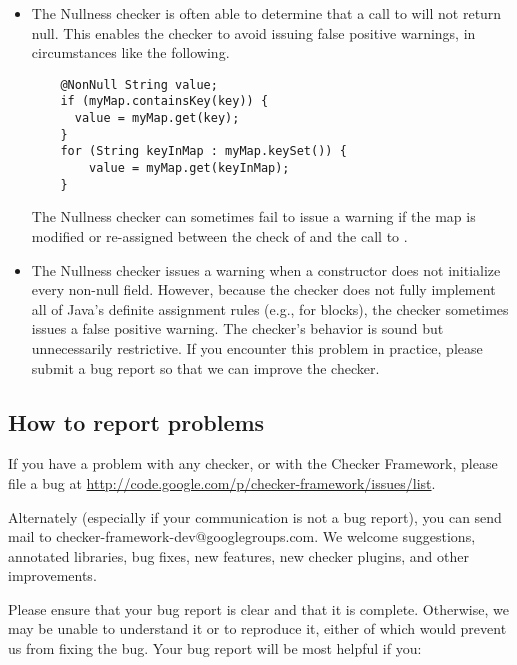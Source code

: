 \begin{itemize}
\item
  The Nullness checker is often able to determine that a call to
   will not return null.  This enables the checker to avoid
  issuing false positive warnings, in circumstances like the following.

\begin{Verbatim}
    @NonNull String value;
    if (myMap.containsKey(key)) {
      value = myMap.get(key);
    }
    for (String keyInMap : myMap.keySet()) {
        value = myMap.get(keyInMap);
    }
\end{Verbatim}

  The Nullness checker can sometimes fail to issue a warning if the map is
  modified or re-assigned between the check of  and the
  call to .



\item 
  The Nullness checker issues a warning when a constructor does not
  initialize every non-null field.  However, because the checker does not
  fully implement all of Java's definite assignment rules (e.g., for
   blocks), the checker sometimes issues a false positive
  warning.  The checker's behavior is sound but unnecessarily restrictive.
  If you encounter this problem in practice, please submit a bug report so
  that we can improve the checker.

\end{itemize}



\subsection{How to report problems\label{reporting-bugs}}

If you have a problem with any checker, or with the Checker Framework,
please file a bug at 
\url{http://code.google.com/p/checker-framework/issues/list}.

Alternately (especially if your communication is not a bug report), you can
send mail to checker-framework-dev@googlegroups.com.
We welcome suggestions, annotated libraries, bug fixes, new
features, new checker plugins, and other improvements.

Please ensure that your bug report is clear and that it is complete.
Otherwise, we may be unable to understand it or to reproduce it, either of
which would prevent us from fixing the bug.  Your bug report will be most
helpful if you:

